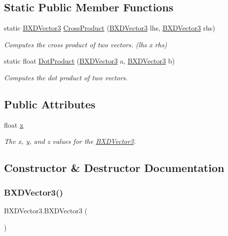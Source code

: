 \subsection*{Static Public Member Functions}
\begin{DoxyCompactItemize}
\item 
static \hyperlink{class_b_x_d_vector3}{B\+X\+D\+Vector3} \hyperlink{class_b_x_d_vector3_ae71ca5cd2508572c76c60ee21f702d3a}{Cross\+Product} (\hyperlink{class_b_x_d_vector3}{B\+X\+D\+Vector3} lhs, \hyperlink{class_b_x_d_vector3}{B\+X\+D\+Vector3} rhs)
\begin{DoxyCompactList}\small\item\em Computes the cross product of two vectors. (lhs x rhs) \end{DoxyCompactList}\item 
static float \hyperlink{class_b_x_d_vector3_ad0b239d2be5d8b8a5845ed1030a1d1cb}{Dot\+Product} (\hyperlink{class_b_x_d_vector3}{B\+X\+D\+Vector3} a, \hyperlink{class_b_x_d_vector3}{B\+X\+D\+Vector3} b)
\begin{DoxyCompactList}\small\item\em Computes the dot product of two vectors. \end{DoxyCompactList}\end{DoxyCompactItemize}
\subsection*{Public Attributes}
\begin{DoxyCompactItemize}
\item 
float \hyperlink{class_b_x_d_vector3_a46633bfd92ba8052494bc1918d1762a4}{x}
\begin{DoxyCompactList}\small\item\em The x, y, and z values for the \hyperlink{class_b_x_d_vector3}{B\+X\+D\+Vector3}. \end{DoxyCompactList}\end{DoxyCompactItemize}


\subsection{Constructor \& Destructor Documentation}
\mbox{\label{class_b_x_d_vector3_a0e2a2ec4422390656dc569146bbceb5b}} 
\subsubsection{\texorpdfstring{B\+X\+D\+Vector3()}{BXDVector3()}\hspace{0.1cm}{\footnotesize\ttfamily [1/3]}}
{\footnotesize\ttfamily B\+X\+D\+Vector3.\+B\+X\+D\+Vector3 (\begin{DoxyParamCaption}{ }\end{DoxyParamCaption})}



